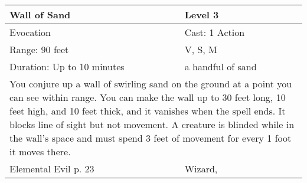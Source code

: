 \documentclass[11pt]{report}
\begin{document}
\begin{table}[H]
	\begin{tabular}{||p{6cm}|p{6cm}||}
		\hline\hline
		\bf{Wall of Sand} & Level 3\\ \hline
		Evocation & Cast: 1 Action\\ \hline
		Range: 90 feet & V, S, M\\ \hline
		Duration: Up to 10 minutes & a handful of sand\\ \hline
		\multicolumn{2}{||p{12cm}||}{You conjure up a wall of swirling sand on the ground at a point you can see within range. You can make the wall up to 30 feet long, 10 feet high, and 10 feet thick, and it vanishes when the spell ends. It blocks line of sight but not movement. A creature is blinded while in the wall’s space and must spend 3 feet of movement for every 1 foot it moves there.}\\ \hline
Elemental Evil p. 23 & Wizard, \\ \hline\hline
	\end{tabular}
\end{table}
\end{document}
